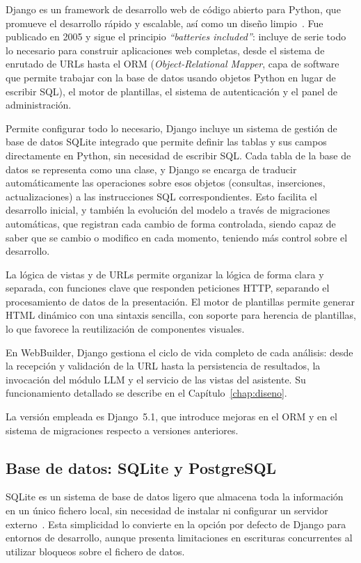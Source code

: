 Django es un framework de desarrollo web de código abierto para Python, que promueve 
el desarrollo rápido y escalable, así como un diseño limpio~\cite{django_docs}. 
Fue publicado en 2005 y sigue el principio \emph{``batteries included''}: incluye 
de serie todo lo necesario para construir aplicaciones web completas, desde el sistema 
de enrutado de URLs hasta el ORM (\emph{Object-Relational Mapper}, capa de software que permite trabajar con la base de datos usando objetos Python en lugar de escribir SQL), el motor de 
plantillas, el sistema de autenticación y el panel de administración.

Permite configurar todo lo necesario, Django incluye un sistema de gestión de base de datos SQLite integrado que permite definir las tablas y sus campos directamente en Python, sin necesidad de escribir SQL. Cada tabla de la base de datos se representa como una clase, y Django se encarga de traducir automáticamente las operaciones sobre esos objetos (consultas, inserciones, actualizaciones) a las instrucciones SQL correspondientes. Esto facilita el desarrollo inicial, y también la evolución del modelo a través de migraciones automáticas, que registran cada cambio de forma controlada, siendo capaz de saber que se cambio o modifico en cada momento, teniendo más control sobre el desarrollo.

La lógica de vistas y de URLs permite organizar la lógica de forma clara y separada, con funciones clave que responden peticiones HTTP, separando el procesamiento de datos de la presentación. El motor de plantillas permite generar HTML dinámico con una sintaxis sencilla, con soporte para herencia de plantillas, lo que favorece la reutilización de componentes visuales.

En WebBuilder, Django gestiona el ciclo de vida completo de cada análisis: desde la recepción y validación de la URL hasta la persistencia de resultados, la invocación del módulo LLM y el servicio de las vistas del asistente. Su funcionamiento detallado se describe en el Capítulo~\ref{chap:diseno}.

La versión empleada es Django~5.1, que introduce mejoras en el ORM y en el sistema de migraciones respecto a versiones anteriores.


\subsection{Base de datos: SQLite y PostgreSQL}
\label{subsec:base-datos}

SQLite es un sistema de base de datos ligero que almacena toda la información en un único fichero local, sin necesidad de instalar ni configurar un servidor externo~\cite{sqlite_docs}. Esta simplicidad lo convierte en la opción por defecto de Django para entornos de desarrollo, aunque presenta limitaciones en escrituras concurrentes al utilizar bloqueos sobre el fichero de datos.

